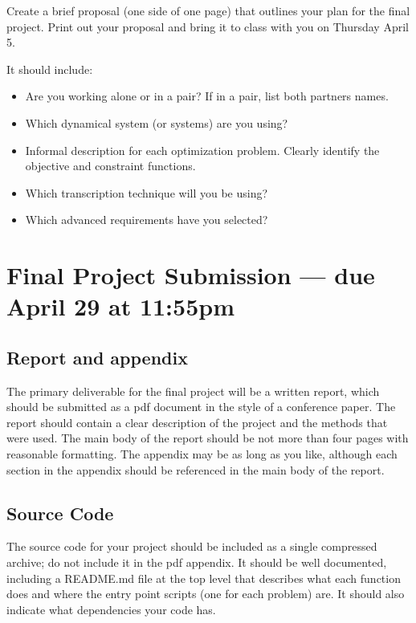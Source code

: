 Create a brief proposal (one side of one page) that outlines your plan for the
final project. Print out your proposal and bring it to class with you on Thursday April 5.

It should include:

\vspace{-0.0em} \begin{itemize}  \setlength\itemsep{0em} \setlength\itemindent{18pt}

\item Are you working alone or in a pair? If in a pair, list both partners names.

\item Which dynamical system (or systems) are you using?

\item Informal description for each optimization problem.
      Clearly identify the objective and constraint functions.

\item Which transcription technique will you be using?

\item Which advanced requirements have you selected?

\end{itemize}


\section*{Final Project Submission  --- due April 29 at 11:55pm}

\subsection*{Report and appendix}
The primary deliverable for the final project will be a written report,
which should be submitted as a pdf document in the style of a conference paper.
The report should contain a clear description of the project and the methods that were used.
The main body of the report should be not more than four pages with reasonable formatting.
The appendix may be as long as you like, although each section in the appendix should be
referenced in the main body of the report.

\subsection*{Source Code}
The source code for your project should be included as a single compressed archive;
do not include it in the pdf appendix. It should be well documented, including a
README.md file at the top level that describes what each function does and where the
entry point scripts (one for each problem) are. It should also indicate what dependencies
your code has.

